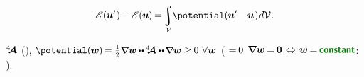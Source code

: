 \nopagebreak\vspace{-0.2em}\begin{equation*}
\potentialenergyfunctional \hspace{.16ex} (\hspace{-0.1ex}\bm{u}'\hspace{.1ex}) \hspace{-0.2ex} -
\potentialenergyfunctional \hspace{.16ex} (\hspace{-0.1ex}\bm{u}\hspace{-0.1ex}) \hspace{-0.2ex}
= \hspace{-0.3ex}
\scalebox{0.9}{$\displaystyle\integral\displaylimits_{\mathcal{V}}$} \hspace{-0.22ex}
\potential(\hspace{-0.1ex}\bm{u}' \hspace{-0.4ex} - \hspace{-0.1ex} \bm{u}\hspace{.1ex})
\hspace{.1ex} d\mathcal{V}
.
\end{equation*}

 $\hspace{.08ex}{^4\hspace{-0.7ex}\bm{\mathcal{A}}}\hspace{.08ex}$  (),
${\potential(\hspace{-0.1ex}\bm{w}\hspace{-0.1ex}) \hspace{-0.25ex} = \smallerdisplaystyleonehalf \scalebox{0.95}{$\boldnabla \bm{w} \hspace{-0.1ex} \dotdotp \hspace{-0.1ex} \stiffnesstensor \dotdotp \hspace{-0.25ex} \boldnabla \bm{w}$} \hspace{-0.1ex} \geq \hspace{-0.1ex} 0 \hspace{.8ex} \forall \bm{w}}$
( ${= \hspace{-0.2ex} 0}$  ${\boldnabla \bm{w} \hspace{-0.2ex} = \hspace{-0.2ex} \bm{0} \hspace{.2ex}\Leftrightarrow\hspace{.2ex} \bm{w} \hspace{-0.2ex} = \hspace{-0.2ex} \boldconstant}$:   ).

